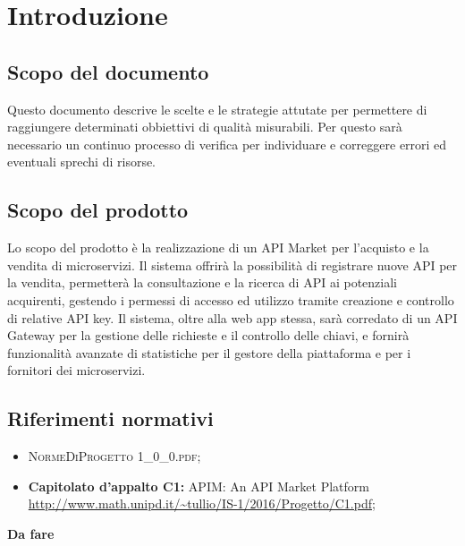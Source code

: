 \newpage
\section{Introduzione}

\subsection{Scopo del documento}
Questo documento descrive le scelte e le strategie attutate per permettere di raggiungere determinati obbiettivi di qualità misurabili. Per questo sarà necessario un continuo processo di verifica per individuare e correggere errori ed eventuali sprechi di risorse.

\subsection{Scopo del prodotto}
Lo scopo del prodotto è la realizzazione di un API Market per l'acquisto e la vendita di microservizi. Il sistema offrirà la possibilità di registrare nuove API per la vendita, permetterà la consultazione e la ricerca di API ai potenziali acquirenti, gestendo i permessi di accesso ed utilizzo tramite creazione e controllo di relative API key. Il sistema, oltre alla web app stessa, sarà corredato di un API Gateway per la gestione delle richieste e il controllo delle chiavi, e fornirà funzionalità avanzate di statistiche per il gestore della piattaforma e per i fornitori dei microservizi.

\subsection{Riferimenti normativi}
\begin{itemize}
\item \textsc{NormeDiProgetto 1\_0\_0.pdf};
\item \textbf{Capitolato d’appalto C1:} APIM: An API Market Platform\\ \url{http://www.math.unipd.it/~tullio/IS-1/2016/Progetto/C1.pdf};
\end{itemize}
\textbf{Da fare}

